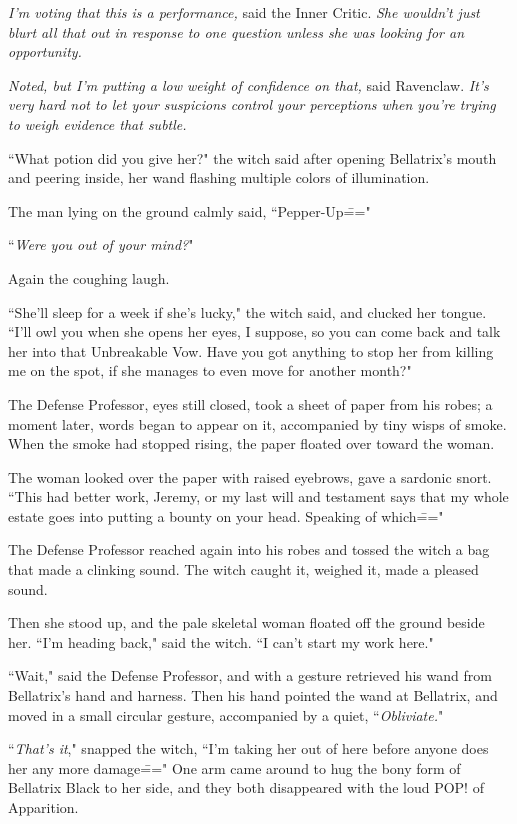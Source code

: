 \emph{I'm voting that this is a performance,} said the Inner Critic. \emph{She wouldn't just blurt all that out in response to one question unless she was looking for an opportunity.}

\emph{Noted, but I'm putting a low weight of confidence on that,} said Ravenclaw. \emph{It's very hard not to let your suspicions control your perceptions when you're trying to weigh evidence that subtle.}

``What potion did you give her?" the witch said after opening Bellatrix's mouth and peering inside, her wand flashing multiple colors of illumination.

The man lying on the ground calmly said, ``Pepper-Up\==="

``\emph{Were you out of your mind?}"

Again the coughing laugh.

``She'll sleep for a week if she's lucky," the witch said, and clucked her tongue. ``I'll owl you when she opens her eyes, I suppose, so you can come back and talk her into that Unbreakable Vow. Have you got anything to stop her from killing me on the spot, if she manages to even move for another month?"

The Defense Professor, eyes still closed, took a sheet of paper from his robes; a moment later, words began to appear on it, accompanied by tiny wisps of smoke. When the smoke had stopped rising, the paper floated over toward the woman.

The woman looked over the paper with raised eyebrows, gave a sardonic snort. ``This had better work, Jeremy, or my last will and testament says that my whole estate goes into putting a bounty on your head. Speaking of which\==="

The Defense Professor reached again into his robes and tossed the witch a bag that made a clinking sound. The witch caught it, weighed it, made a pleased sound.

Then she stood up, and the pale skeletal woman floated off the ground beside her. ``I'm heading back," said the witch. ``I can't start my work here."

``Wait," said the Defense Professor, and with a gesture retrieved his wand from Bellatrix's hand and harness. Then his hand pointed the wand at Bellatrix, and moved in a small circular gesture, accompanied by a quiet, ``\emph{Obliviate.}"

``\emph{That's it}," snapped the witch, ``I'm taking her out of here before anyone does her any more damage\===" One arm came around to hug the bony form of Bellatrix Black to her side, and they both disappeared with the loud POP! of Apparition.

